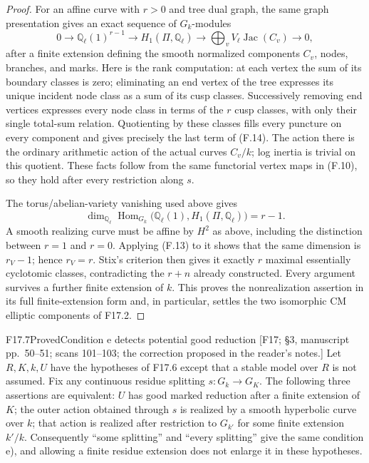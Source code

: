 \begin{proof}
For an affine curve with $r>0$ and tree dual graph, the same graph
presentation gives an exact sequence of $G_k$-modules
\[
 0\longrightarrow\mathbb Q_\ell(1)^{r-1}
 \longrightarrow H_1(\Pi,\mathbb Q_\ell)
 \longrightarrow\bigoplus_v V_\ell\operatorname{Jac}(C_v)
 \longrightarrow0,                                            \tag{F.14}
\]
after a finite extension defining the smooth normalized components
$C_v$, nodes, branches, and marks. Here is the rank computation:
at each vertex the sum of its boundary classes is zero; eliminating
an end vertex of the tree expresses its unique incident node
class as a sum of its cusp classes. Successively removing end
vertices expresses every node class in terms of the $r$ cusp
classes, with only their single total-sum relation. Quotienting
by these classes fills every puncture on every component and
gives precisely the last term of (F.14). The action there is the
ordinary arithmetic action of the actual curves $C_v/k$; log
inertia is trivial on this quotient. These facts follow from the
same functorial vertex maps in (F.10), so they hold after every
restriction along $s$.

The torus/abelian-variety vanishing used above gives
\[
 \dim_{\mathbb Q_\ell}
 \operatorname{Hom}_{G_k}\bigl(\mathbb Q_\ell(1),
 H_1(\Pi,\mathbb Q_\ell)\bigr)=r-1.                           \tag{F.15}
\]
A smooth realizing curve must be affine by $H^2$ as above,
including the distinction between $r=1$ and $r=0$.
Applying (F.13) to it shows that the same dimension is $r_V-1$;
hence $r_V=r$. Stix's criterion then gives it exactly $r$ maximal
essentially cyclotomic classes, contradicting the $r+n$ already
constructed. Every argument survives a further finite extension
of $k$. This proves the nonrealization assertion in its full
finite-extension form and, in particular, settles the two
isomorphic CM elliptic components of F17.2.
\end{proof}

\begin{result}{F17.7}{Proved}{Condition e detects potential good reduction}
\textup{[F17; \S3, manuscript pp.\ 50--51; scans 101--103;
the correction proposed in the reader's notes.]}
Let $R,K,k,U$ have the hypotheses of F17.6 except that a stable
model over $R$ is not assumed. Fix any continuous residue
splitting $s:G_k\to G_K$. The following three assertions are
equivalent: $U$ has good marked reduction after a finite extension
of $K$; the outer action obtained through $s$ is realized by a
smooth hyperbolic curve over $k$; that action is realized after
restriction to $G_{k'}$ for some finite extension $k'/k$.
Consequently ``some splitting'' and ``every splitting'' give
the same condition e), and allowing a finite residue extension
does not enlarge it in these hypotheses.
\end{result}

